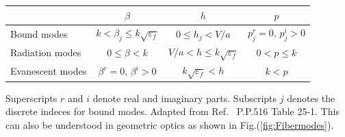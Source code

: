 \begin{minipage}{0.97\textwidth}
\centering
{} \label{tab:fiberparameters} 
\begin{tabular}{|l|c|c|c|}
\hline  & $\beta$ & $h$ & $p$ \\ 
\hline Bound modes & $k<\beta_j \leq k\sqrt{\varepsilon_f} $ & $ 0\leq h_j<V/a $ & $ p^r_j=0,\, p^i_j>0 $ \\ 
\hline Radiation modes & $0\leq \beta<k$ & $V/a < h\leq k\sqrt{\varepsilon_f}$ & $0<p\leq k $\\ 
\hline Evanescent modes & $ \beta^r=0,\, \beta^i>0 $ & $ k\sqrt{\varepsilon_f} < h $ & $ k<p $ \\ 
\hline 
\end{tabular} 
\par
\bigskip
Superscripts $ r $ and $ i $ denote real and imaginary parts. Subscripts $ j $ denotes the discrete indeces for bound modes. Adapted from Ref.~\cite{Snyder1983} P.P.516 Table 25-1. This can also be understood in geometric optics as shown in Fig.(\ref{fig:Fibermodes}).
\end{minipage}
\bigskip

